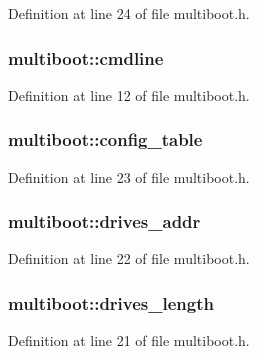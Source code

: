 Definition at line 24 of file multiboot.\-h.

\hypertarget{structmultiboot_aec49b8fa70998fb8c40e10d3e085a011}{
\subsubsection[{cmdline}]{ multiboot\-::cmdline}}\label{structmultiboot_aec49b8fa70998fb8c40e10d3e085a011}


Definition at line 12 of file multiboot.\-h.

\hypertarget{structmultiboot_af6f16dad5291bd882d56902a60e799c2}{
\subsubsection[{config\-\_\-table}]{ multiboot\-::config\-\_\-table}}\label{structmultiboot_af6f16dad5291bd882d56902a60e799c2}


Definition at line 23 of file multiboot.\-h.

\hypertarget{structmultiboot_ace53c2abbb16b1883be941f3147a0a1a}{
\subsubsection[{drives\-\_\-addr}]{ multiboot\-::drives\-\_\-addr}}\label{structmultiboot_ace53c2abbb16b1883be941f3147a0a1a}


Definition at line 22 of file multiboot.\-h.

\hypertarget{structmultiboot_ac4ed667a59de48634e82f06becff8b50}{
\subsubsection[{drives\-\_\-length}]{ multiboot\-::drives\-\_\-length}}\label{structmultiboot_ac4ed667a59de48634e82f06becff8b50}


Definition at line 21 of file multiboot.\-h.

